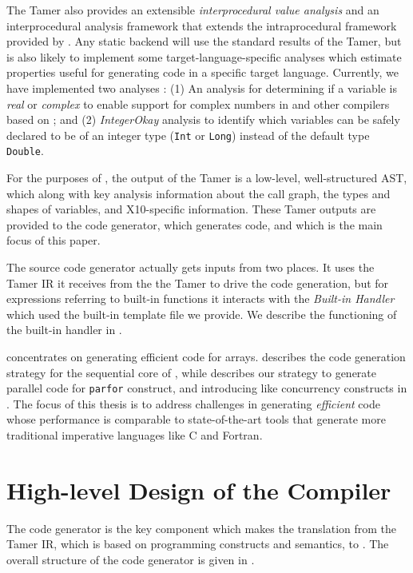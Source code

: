 The Tamer also provides an extensible \textit{interprocedural value
analysis} and an interprocedural analysis framework that extends the
intraprocedural framework provided by \mcsaf.   Any static backend will
use the standard results of the Tamer,  but is also likely to implement
some target-language-specific analyses which estimate properties useful
for generating code in a specific target language. Currently, we have
implemented two analyses : (1) An analysis for determining if a \matlab
variable is \textit{real} or \textit{complex} to enable support for
complex numbers in \mixten and other \matlab compilers based on \mclab;
and (2) \emph{IntegerOkay} analysis to identify which variables can be
safely declared to be of an integer type (\texttt{Int} or \texttt{Long})
instead of the default type \texttt{Double}.  

For the purposes of \mixten, the output of the Tamer is a low-level,
well-structured AST, which along with key analysis information about the
call graph,  the types and shapes of variables, and X10-specific
information.   These Tamer outputs are provided to the code generator,
which generates \xten code, and which is the main focus of this paper.

The \xten source code generator actually gets inputs from two places.  It uses
the Tamer IR it receives from the the Tamer to drive the code generation,  but
for expressions referring to built-in \matlab functions it interacts with the
\textit{Built-in Handler} which used the built-in template file we provide.  We
describe the functioning of the
built-in handler in . 

 concentrates on generating efficient code for \matlab
arrays.   describes the code generation strategy for
the sequential core of \matlab, while  describes our
strategy to generate parallel \xten code for \matlab \texttt{parfor} construct,
and introducing \xten like concurrency constructs in \matlab. The focus of this
thesis is to address challenges in generating \emph{efficient} \xten code whose
performance is comparable to state-of-the-art tools that generate more
traditional imperative languages like C and Fortran.

\section{High-level Design of the \mixten Compiler}

The \mixten code generator is the key component which makes the
translation from the Tamer IR, which is based on \matlab programming
constructs and semantics,  to \xten.  The overall structure of the
\mixten code generator is given in .

